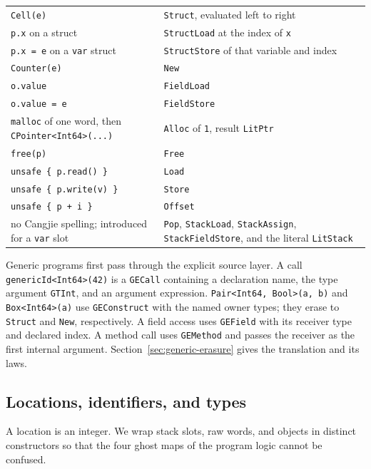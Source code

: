 \documentclass[11pt]{article}
\begin{document}
\begin{center}
\begin{tabular}{@{}p{}p{}@{}}
\hline
\texttt{Cell(e)}
  & \texttt{Struct}, evaluated left to right \\
\texttt{p.x} on a struct
  & \texttt{StructLoad} at the index of \texttt{x} \\
\texttt{p.x = e} on a \texttt{var} struct
  & \texttt{StructStore} of that variable and index \\
\texttt{Counter(e)}
  & \texttt{New} \\
\texttt{o.value}
  & \texttt{FieldLoad} \\
\texttt{o.value = e}
  & \texttt{FieldStore} \\
\hline
\texttt{malloc} of one word, then \texttt{CPointer<Int64>(...)}
  & \texttt{Alloc} of \texttt{1}, result \texttt{LitPtr} \\
\texttt{free(p)}
  & \texttt{Free} \\
\texttt{unsafe \{ p.read() \}}
  & \texttt{Load} \\
\texttt{unsafe \{ p.write(v) \}}
  & \texttt{Store} \\
\texttt{unsafe \{ p + i \}}
  & \texttt{Offset} \\
\hline
no Cangjie spelling; introduced for a \texttt{var} slot
  & \texttt{Pop}, \texttt{StackLoad}, \texttt{StackAssign}, \texttt{StackFieldStore}, and the literal \texttt{LitStack} \\
\hline
\end{tabular}
\end{center}

Generic programs first pass through the explicit source layer. A call
\texttt{genericId<Int64>(42)} is a \texttt{GECall} containing a declaration
name, the type argument \texttt{GTInt}, and an argument expression.
\texttt{Pair<Int64, Bool>(a, b)} and \texttt{Box<Int64>(a)} use
\texttt{GEConstruct} with the named owner types; they erase to \texttt{Struct}
and \texttt{New}, respectively. A field access uses \texttt{GEField} with its
receiver type and declared index. A method call uses \texttt{GEMethod} and
passes the receiver as the first internal argument.
Section~\ref{sec:generic-erasure} gives the translation and its laws.

\subsection{Locations, identifiers, and types}

A location is an integer.
We wrap stack slots, raw words, and objects in distinct constructors so that the four ghost maps of the program logic cannot be confused.
\end{document}

